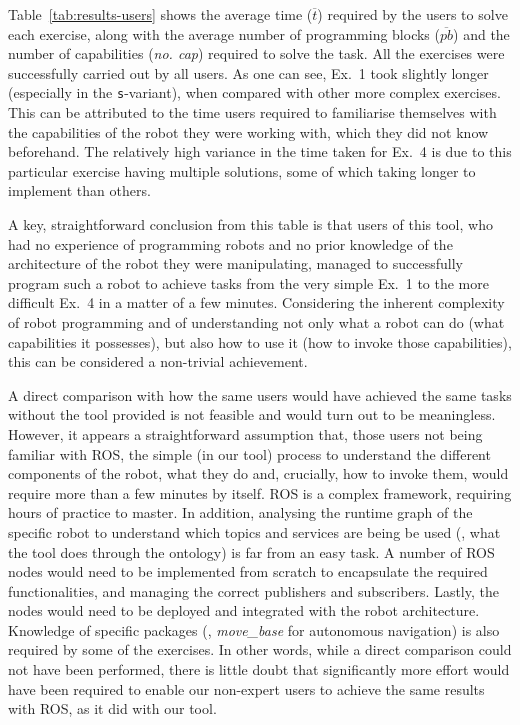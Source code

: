 Table~\ref{tab:results-users} shows the average time ($\overline{t}$) required by the users to solve each exercise, along with the average number of programming blocks ($\overline{pb}$) and the number of capabilities (\textit{no. cap}) required to solve the task. All the exercises were successfully carried out by all users. As one can see, Ex.~1 took slightly longer (especially in the \texttt{s}-variant), when compared with other more complex exercises. This can be attributed to the time users required to familiarise themselves with the capabilities of the robot they were working with, which they did not know beforehand. The relatively high variance in the time taken for Ex.~4 is due to this particular exercise having multiple solutions, some of which taking longer to implement than others. 

A key, straightforward conclusion from this table is that users of this tool, who had no experience of programming robots and no prior knowledge of the architecture of the robot they were manipulating, managed to successfully program such a robot to achieve tasks from the very simple Ex.~1 to the more difficult Ex.~4 in a matter of a few minutes. Considering the inherent complexity of robot programming and of understanding not only what a robot can do (what capabilities it possesses), but also how to use it (how to invoke those capabilities), this can be considered a non-trivial achievement. 

A direct comparison with how the same users would have achieved the same tasks without the tool provided is not feasible and would turn out to be meaningless. However, it appears a straightforward assumption that, those users not being familiar with ROS, the simple (in our tool) process to understand the different components of the robot, what they do and, crucially, how to invoke them, would require more than a few minutes by itself. ROS is a complex framework, requiring hours of practice to master. In addition, analysing the runtime graph of the specific robot to understand which topics and services are being be used (\ie, what the tool does through the ontology) is far from an easy task. A number of ROS nodes would need to be implemented from scratch to encapsulate the required functionalities, and managing the correct publishers and subscribers. Lastly, the nodes would need to be deployed and integrated with the robot architecture. Knowledge of specific packages (\eg, \textit{move\_base} for autonomous navigation) is also required by some of the exercises. In other words, while a direct comparison could not have been performed, there is little doubt that significantly more effort would have been required to enable our non-expert users to achieve the same results with ROS, as it did with our tool.

